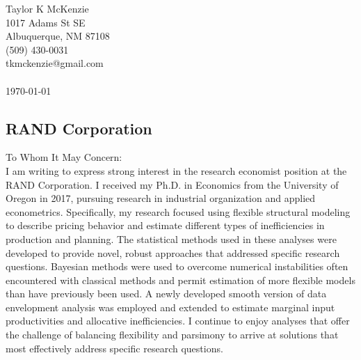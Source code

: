 \documentclass[]{article}
\begin{document}
\thispagestyle{empty}

\noindent Taylor K McKenzie\\1017 Adams St SE\\ Albuquerque, NM 87108\\ (509) 430-0031\\ tkmckenzie@gmail.com\\ \\
\today

\subsection*{RAND Corporation}

To Whom It May Concern: \\

I am writing to express strong interest in the research economist position at the RAND Corporation. I received my Ph.D. in Economics from the University of Oregon in 2017, pursuing research in industrial organization and applied econometrics. Specifically, my research focused using flexible structural modeling to describe pricing behavior and estimate different types of inefficiencies in production and planning. The statistical methods used in these analyses were developed to provide novel, robust approaches that addressed specific research questions. Bayesian methods were used to overcome numerical instabilities often encountered with classical methods and permit estimation of more flexible models than have previously been used. A newly developed smooth version of data envelopment analysis was employed and extended to estimate marginal input productivities and allocative inefficiencies. I continue to enjoy analyses that offer the challenge of balancing flexibility and parsimony to arrive at solutions that most effectively address specific research questions.\\
\end{document}
